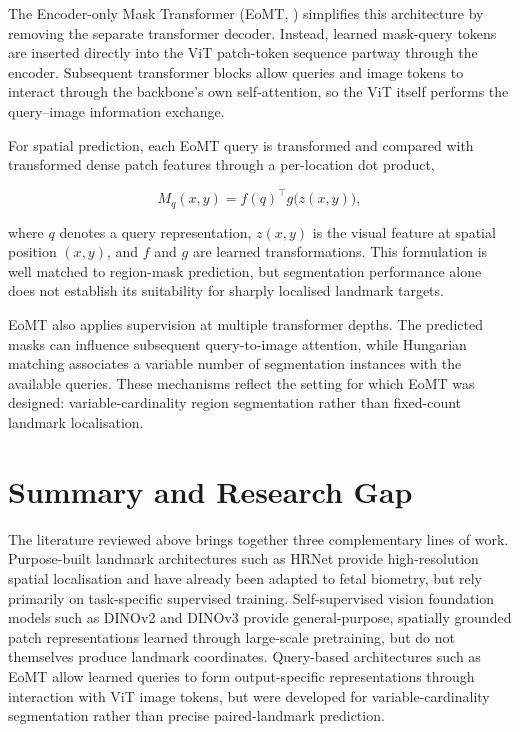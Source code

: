 The Encoder-only Mask Transformer (EoMT,
\textcite{kerssies2025eomt}) simplifies this architecture by removing
the separate transformer decoder. Instead, learned mask-query tokens
are inserted directly into the ViT patch-token sequence partway
through the encoder. Subsequent transformer blocks allow queries and
image tokens to interact through the backbone's own self-attention,
so the ViT itself performs the query--image information exchange.

For spatial prediction, each EoMT query is transformed and compared
with transformed dense patch features through a per-location dot
product,

\begin{equation}
    \label{eq:bg-einsum}
    M_q(x,y)
    =
    f(q)^\top g\bigl(z(x,y)\bigr),
\end{equation}

where $q$ denotes a query representation, $z(x,y)$ is the visual
feature at spatial position $(x,y)$, and $f$ and $g$ are learned
transformations. This formulation is well matched to region-mask
prediction, but segmentation performance alone does not establish
its suitability for sharply localised landmark targets.

EoMT also applies supervision at multiple transformer depths. The
predicted masks can influence subsequent query-to-image attention,
while Hungarian matching associates a variable number of
segmentation instances with the available queries. These mechanisms
reflect the setting for which EoMT was designed:
variable-cardinality region segmentation rather than fixed-count
landmark localisation.



\section{Summary and Research Gap}
\label{sec:bg-summary}

The literature reviewed above brings together three complementary
lines of work. Purpose-built landmark architectures such as HRNet
provide high-resolution spatial localisation and have already been
adapted to fetal biometry, but rely primarily on task-specific
supervised training. Self-supervised vision foundation models such as
DINOv2 and DINOv3 provide general-purpose, spatially grounded patch
representations learned through large-scale pretraining, but do not
themselves produce landmark coordinates. Query-based architectures
such as EoMT allow learned queries to form output-specific
representations through interaction with ViT image tokens, but were
developed for variable-cardinality segmentation rather than precise
paired-landmark prediction.


